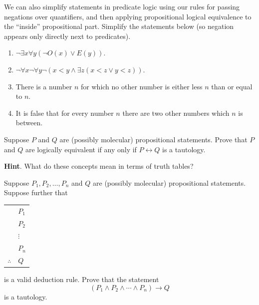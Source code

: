 \documentclass[10pt,]{book}
\theoremstyle{plain}
\theoremstyle{definition}
\theoremstyle{definition}
\theoremstyle{definition}
\theoremstyle{definition}
\numberwithin{equation}{chapter}
\newcommand{\hrulethin}  {\noalign{\hrule height 0.04em}}
\def\iff{\leftrightarrow}
\def\imp{\rightarrow}
\newcommand{\lt}{<}
\begin{document}
\begin{divisionexercise}{14}\hypertarget{exercise-233}{}
\hypertarget{p-1894}{}%
We can also simplify statements in predicate logic using our rules for passing negations over quantifiers, and then applying propositional logical equivalence to the ``inside'' propositional part.  Simplify the statements below (so negation appears only directly next to predicates).%
\par
\hypertarget{p-1895}{}%
\leavevmode%
\begin{enumerate}[label=(\alph*)]
\item\hypertarget{li-663}{}\(\neg \exists x \forall y (\neg O(x) \vee E(y))\).%
\item\hypertarget{li-664}{}\(\neg \forall x \neg \forall y \neg(x \lt  y \wedge \exists z (x \lt  z \vee y \lt  z))\).%
\item\hypertarget{li-665}{}\hypertarget{p-1896}{}%
There is a number \(n\) for which no other number is either less \(n\) than or equal to \(n\).%
\item\hypertarget{li-666}{}\hypertarget{p-1897}{}%
It is false that for every number \(n\) there are two other numbers which \(n\) is between.%
\end{enumerate}
%
\end{divisionexercise}%
\begin{divisionexercise}{15}\hypertarget{exercise-234}{}
\hypertarget{p-1901}{}%
Suppose \(P\) and \(Q\) are (possibly molecular) propositional statements.  Prove that \(P\) and \(Q\) are logically equivalent if any only if \(P \iff Q\) is a tautology.%
\par\smallskip%
\noindent\textbf{Hint}.\hypertarget{hint-72}{}\quad%
\hypertarget{p-1902}{}%
What do these concepts mean in terms of truth tables?%
\end{divisionexercise}%
\begin{divisionexercise}{16}\hypertarget{exercise-235}{}
\hypertarget{p-1903}{}%
Suppose \(P_1, P_2, \ldots, P_n\) and \(Q\) are (possibly molecular) propositional statements.  Suppose further that%
\begin{sidebyside}{1}{0}{0}{0}
\begin{sbspanel}{1}
{\centering%
\begin{tabular}{ll}
&\(P_1\)\tabularnewline[0pt]
&\(P_2\)\tabularnewline[0pt]
&\(\vdots\)\tabularnewline[0pt]
&\(P_n\)\tabularnewline\hrulethin
\(\therefore\)&\(Q\)
\end{tabular}
\par}
\end{sbspanel}
\end{sidebyside}
\par
\hypertarget{p-1904}{}%
is a valid deduction rule.  Prove that the statement%
\begin{equation*}
(P_1 \wedge P_2 \wedge \cdots \wedge P_n) \imp Q
\end{equation*}
is a tautology.%
\end{divisionexercise}%
\typeout{************************************************}
\typeout{************************************************}
\end{document}
